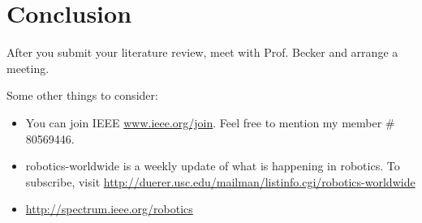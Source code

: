 \documentclass[letterpaper, 10 pt, conference]{ieeeconf}
\begin{document}
\section{Conclusion}

After you submit your literature review, meet with Prof. Becker and arrange a meeting.  

Some other things to consider:
\begin{itemize}
\item You can join IEEE \href{www.ieee.org/join}{www.ieee.org/join}.  Feel free to mention my member \# 80569446.
\item 
robotics-worldwide is a weekly update of what is happening in robotics. To subscribe, visit
        \href{http://duerer.usc.edu/mailman/listinfo.cgi/robotics-worldwide}{http://duerer.usc.edu/mailman/listinfo.cgi/robotics-worldwide}
        \item \href{http://spectrum.ieee.org/robotics}{http://spectrum.ieee.org/robotics}
\end{itemize}
 
 
\end{document}
